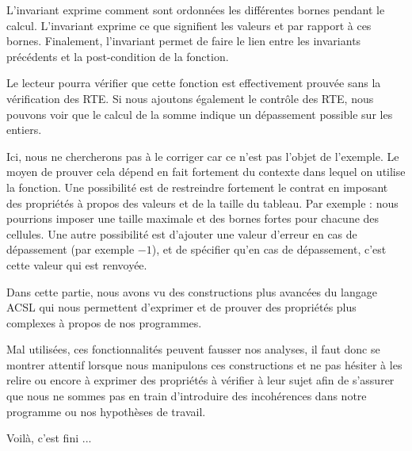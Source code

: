 \documentclass[middle]{zmdocument}
\begin{document}
L'invariant  exprime comment sont ordonnées les différentes bornes 
pendant le calcul. L'invariant  exprime ce que signifient les 
valeurs  et  par rapport à ces bornes. Finalement, 
l'invariant  permet de faire le lien entre les invariants précédents 
et la post-condition de la fonction.



Le lecteur pourra vérifier que cette fonction est effectivement prouvée sans la
vérification des RTE. Si nous ajoutons également le contrôle des RTE, nous pouvons
voir que le calcul de la somme indique un dépassement possible sur les entiers.



Ici, nous ne chercherons pas à le corriger car ce n'est pas l'objet de l'exemple.
Le moyen de prouver cela dépend en fait fortement du contexte dans lequel on 
utilise la fonction. Une possibilité est de restreindre fortement le contrat en
imposant des propriétés à propos des valeurs et de la taille du tableau. Par 
exemple : nous pourrions imposer une taille maximale et des bornes fortes pour
chacune des cellules. Une autre possibilité est d'ajouter une valeur d'erreur
en cas de dépassement (par exemple $-1$), et de spécifier qu'en cas de 
dépassement, c'est cette valeur qui est renvoyée.



\horizontalLine



Dans cette partie, nous avons vu des constructions plus avancées du langage ACSL
qui nous permettent d'exprimer et de prouver des propriétés plus complexes à 
propos de nos programmes.



Mal utilisées, ces fonctionnalités peuvent fausser nos analyses, il faut donc se
montrer attentif lorsque nous manipulons ces constructions et ne pas hésiter à 
les relire ou encore à exprimer des propriétés à vérifier à leur sujet afin de 
s'assurer que nous ne sommes pas en train d'introduire des incohérences dans 
notre programme ou nos hypothèses de travail.





\begin{Quotation}
Voilà, c'est fini ...
\end{Quotation}
\end{document}
